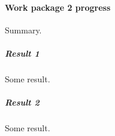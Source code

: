 \paragraph{Work package 2 progress}

Summary.

\subparagraph{Result 1}

Some result.

\subparagraph{Result 2}

Some result.



